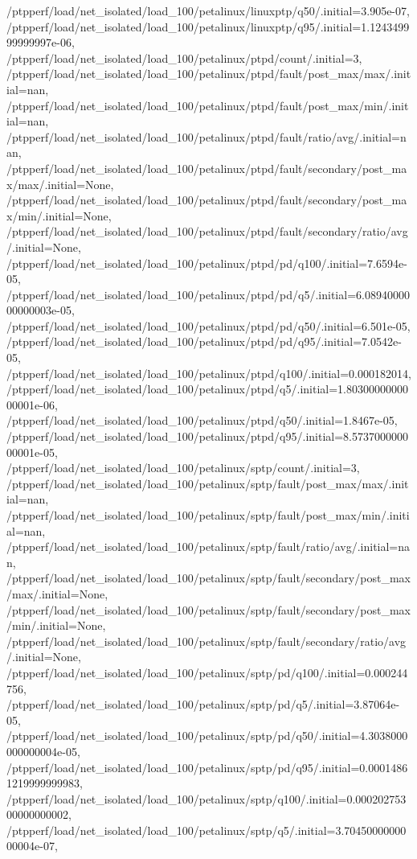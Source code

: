 {    /ptpperf/load/net_isolated/load_100/petalinux/linuxptp/q50/.initial=3.905e-07,
    /ptpperf/load/net_isolated/load_100/petalinux/linuxptp/q95/.initial=1.124349999999997e-06,
    /ptpperf/load/net_isolated/load_100/petalinux/ptpd/count/.initial=3,
    /ptpperf/load/net_isolated/load_100/petalinux/ptpd/fault/post_max/max/.initial=nan,
    /ptpperf/load/net_isolated/load_100/petalinux/ptpd/fault/post_max/min/.initial=nan,
    /ptpperf/load/net_isolated/load_100/petalinux/ptpd/fault/ratio/avg/.initial=nan,
    /ptpperf/load/net_isolated/load_100/petalinux/ptpd/fault/secondary/post_max/max/.initial=None,
    /ptpperf/load/net_isolated/load_100/petalinux/ptpd/fault/secondary/post_max/min/.initial=None,
    /ptpperf/load/net_isolated/load_100/petalinux/ptpd/fault/secondary/ratio/avg/.initial=None,
    /ptpperf/load/net_isolated/load_100/petalinux/ptpd/pd/q100/.initial=7.6594e-05,
    /ptpperf/load/net_isolated/load_100/petalinux/ptpd/pd/q5/.initial=6.0894000000000003e-05,
    /ptpperf/load/net_isolated/load_100/petalinux/ptpd/pd/q50/.initial=6.501e-05,
    /ptpperf/load/net_isolated/load_100/petalinux/ptpd/pd/q95/.initial=7.0542e-05,
    /ptpperf/load/net_isolated/load_100/petalinux/ptpd/q100/.initial=0.000182014,
    /ptpperf/load/net_isolated/load_100/petalinux/ptpd/q5/.initial=1.8030000000000001e-06,
    /ptpperf/load/net_isolated/load_100/petalinux/ptpd/q50/.initial=1.8467e-05,
    /ptpperf/load/net_isolated/load_100/petalinux/ptpd/q95/.initial=8.573700000000001e-05,
    /ptpperf/load/net_isolated/load_100/petalinux/sptp/count/.initial=3,
    /ptpperf/load/net_isolated/load_100/petalinux/sptp/fault/post_max/max/.initial=nan,
    /ptpperf/load/net_isolated/load_100/petalinux/sptp/fault/post_max/min/.initial=nan,
    /ptpperf/load/net_isolated/load_100/petalinux/sptp/fault/ratio/avg/.initial=nan,
    /ptpperf/load/net_isolated/load_100/petalinux/sptp/fault/secondary/post_max/max/.initial=None,
    /ptpperf/load/net_isolated/load_100/petalinux/sptp/fault/secondary/post_max/min/.initial=None,
    /ptpperf/load/net_isolated/load_100/petalinux/sptp/fault/secondary/ratio/avg/.initial=None,
    /ptpperf/load/net_isolated/load_100/petalinux/sptp/pd/q100/.initial=0.000244756,
    /ptpperf/load/net_isolated/load_100/petalinux/sptp/pd/q5/.initial=3.87064e-05,
    /ptpperf/load/net_isolated/load_100/petalinux/sptp/pd/q50/.initial=4.3038000000000004e-05,
    /ptpperf/load/net_isolated/load_100/petalinux/sptp/pd/q95/.initial=0.00014861219999999983,
    /ptpperf/load/net_isolated/load_100/petalinux/sptp/q100/.initial=0.00020275300000000002,
    /ptpperf/load/net_isolated/load_100/petalinux/sptp/q5/.initial=3.7045000000000004e-07,
}
